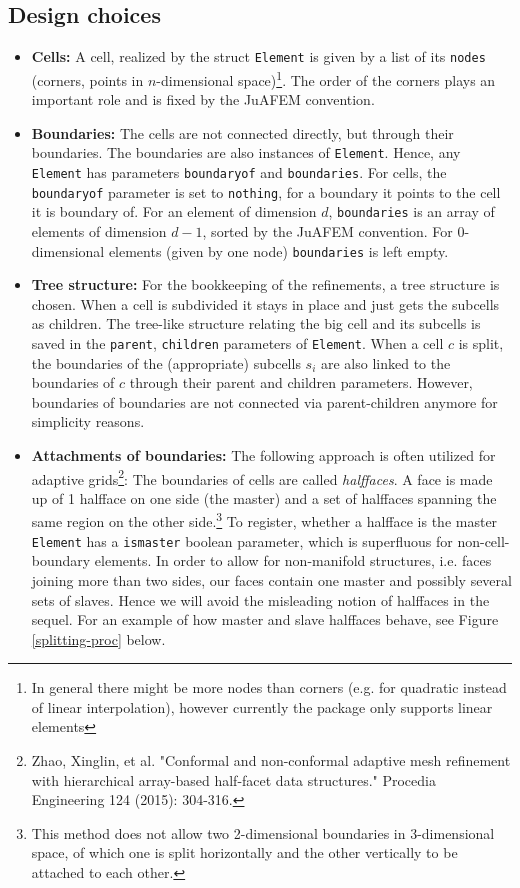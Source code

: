 \documentclass{article}
\begin{document}
\subsection{Design choices}
\begin{itemize}
    \item {\bf Cells:} A cell, realized by the struct \texttt{Element} is given by a list of its  \texttt{nodes} (corners, points in $n$-dimensional space)\footnote{In general there might be more nodes than corners (e.g. for quadratic instead of linear interpolation), however currently the package only supports linear elements}.  The order of the corners plays an important role and is fixed by the JuAFEM convention.
    \item {\bf Boundaries:} The cells are not connected directly, but through their boundaries. The boundaries are also instances of \texttt{Element}. Hence, any \texttt{Element} has parameters \texttt{boundaryof} and \texttt{boundaries}. For cells, the \texttt{boundaryof} parameter is set to \texttt{nothing}, for a boundary it points to the cell it is boundary of. For an element of dimension $d$, \texttt{boundaries} is an array of elements of dimension $d-1$, sorted by the JuAFEM convention. For 0-dimensional elements (given by one node) \texttt{boundaries} is left empty.  
    \item {\bf Tree structure:} For the bookkeeping of the refinements, a tree structure is chosen. When a cell is subdivided it stays in place and just gets the subcells as children. The tree-like structure relating the big cell and its subcells is saved in the \texttt{parent}, \texttt{children} parameters of \texttt{Element}. When a cell $c$ is split, the boundaries of the (appropriate) subcells $s_i$ are also linked to the boundaries of $c$ through their parent and children parameters. However, boundaries of boundaries are not connected via parent-children anymore for simplicity reasons.
    \item {\bf Attachments of boundaries:} The following approach is often utilized for adaptive grids\footnote{Zhao, Xinglin, et al. "Conformal and non-conformal adaptive mesh refinement with hierarchical array-based half-facet data structures." Procedia Engineering 124 (2015): 304-316.}: The boundaries of cells are called \emph{halffaces}. A face is made up of 1 halfface on one side (the master) and a set of halffaces spanning the same region on the other side.\footnote{This method does not allow two 2-dimensional boundaries in 3-dimensional space, of which one is split horizontally and the other vertically to be attached to each other.} To register, whether a halfface is the master \texttt{Element} has a \texttt{ismaster} boolean parameter, which is superfluous for non-cell-boundary elements. In order to allow for non-manifold structures, i.e. faces joining more than two sides, our faces contain one master and possibly several sets of slaves. Hence we will avoid the misleading notion of halffaces in the sequel. For an example of how master and slave halffaces behave, see Figure \ref{splitting-proc} below.

\end{itemize}
\end{document}

